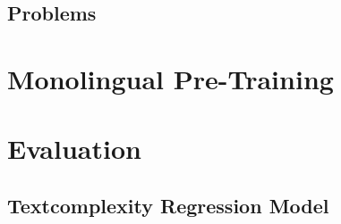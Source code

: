 \subsection{Problems}\label{subsec:problems}



\section{Monolingual Pre-Training}\label{sec:monolingual-pre-training}



\section{Evaluation}\label{sec:evaluation}



\subsection{Textcomplexity Regression Model}\label{subsec:textcomplexity-regression-model}